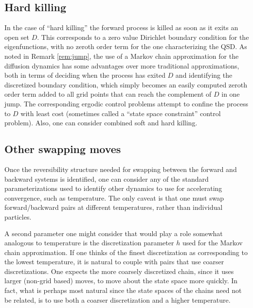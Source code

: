 \documentclass[english,11pt]{article}%
\numberwithin{equation}{section}
\numberwithin{example}{section}
\numberwithin{theorem}{section}
\begin{document}
\subsection{Hard killing}
In the case of ``hard killing'' the forward process is killed as soon as it exits an open set $D$. 
This corresponds to a zero value Dirichlet boundary condition for the eigenfunctions,
with no zeroth order term for the one characterizing the QSD. 
As noted in Remark \ref{rem:jump}, 
the use of a Markov chain approximation for the diffusion dynamics has some advantages over more traditional approximations, 
both in terms of deciding when the process has exited $D$ and identifying the discretized boundary condition, 
which simply becomes an easily computed zeroth order term added to all grid points that can reach the complement of $D$ in one jump. 
The corresponding ergodic control problems attempt to confine the process to $D$ with least cost (sometimes called a ``state space constraint'' control problem).
Also,
one can consider combined soft and hard killing.

\subsection{Other swapping moves}
Once the reversibility structure needed for swapping between the forward and backward systems is identified,
one can consider any of the standard parameterizations used to identify other dynamics to use 
for accelerating convergence,
such as temperature.
The only caveat is that one must swap forward/backward pairs at different temperatures, 
rather than individual particles.

A second parameter one might consider that would play a role somewhat analogous to temperature is the discretization parameter $h$ used for the Markov chain approximation. 
If one thinks of the finest discretization as corresponding to the lowest temperature,
it is natural to couple with pairs that use coarser discretizations.
One expects the more coarsely discretized chain, since it uses larger (non-grid based) moves,
to move about the state space more quickly. 
In fact, what is perhaps most natural since the state spaces of the chains need not be related,
is to use both a coarser discretization and a higher temperature.




\end{document}
